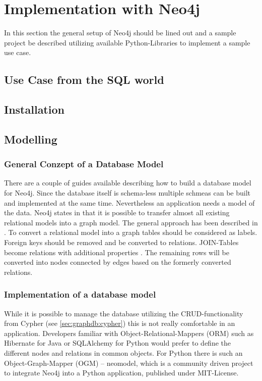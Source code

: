 \section{Implementation with Neo4j}
In this section the general setup of Neo4j should be lined out and a sample project be described utilizing available Python-Libraries to implement a sample use case.

\subsection{Use Case from the SQL world}

\subsection{Installation}

\subsection{Modelling}
\subsubsection{General Conzept of a Database Model}
There are a couple of guides available describing how to build a database model for Neo4j. Since the database itself is schema-less multiple schmeas can be built and implemented at the same time.
Nevertheless an application needs a model of the data.
Neo4j states in \autocite{neo4j:rel_to_graph} that it is possible to transfer almost all existing relational models into a graph model.
The general approach has been described in \autocite{dzone:rel_to_graph}.
To convert a relational model into a graph tables should be considered as labels.
Foreign keys should be removed and be converted to relations.
JOIN-Tables become relations with additional properties \autocite{neo4j:graph_vs_rdbms}.
The remaining rows will be converted into nodes connected by edges based on the formerly converted relations.

\subsubsection{Implementation of a database model}
While it is possible to manage the database utilizing the CRUD-functionality from Cypher (see \ref{sec:graphdb:cypher}) this is not really comfortable in an application.
Developers familiar with Object-Relational-Mappers (ORM) such as Hibernate for Java or SQLAlchemy for Python would prefer to define the different nodes and relations in common objects.
For Python there is such an Object-Graph-Mapper (OGM) -- neomodel, which is a community driven project to integrate Neo4j into a Python application, published under MIT-License.


